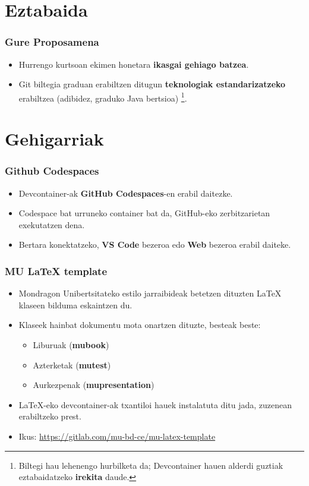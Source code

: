 \documentclass[lang=eu,biz=foe,aspectratio=169,handout]{mupresentation}
\begin{document}
\section{Eztabaida}

\begin{frame}
  \frametitle{Gure Proposamena}
  \begin{itemize}
    \item Hurrengo kurtsoan ekimen honetara \textbf{ikasgai gehiago batzea}.
    \item Git biltegia graduan erabiltzen ditugun \textbf{teknologiak estandarizatzeko} erabiltzea (adibidez, graduko Java bertsioa) \footnote{Biltegi hau lehenengo hurbilketa da; Devcontainer hauen alderdi guztiak eztabaidatzeko \textbf{irekita} daude.}.
  \end{itemize}

\end{frame}

\section[Three more things...]{Gehigarriak}

\begin{frame}
  \frametitle{Github Codespaces}
  \begin{itemize}
    \item Devcontainer-ak \textbf{GitHub Codespaces}-en erabil daitezke.
    \item Codespace bat urruneko container bat da, GitHub-eko zerbitzarietan exekutatzen dena.
    \item Bertara konektatzeko, \textbf{VS Code} bezeroa edo \textbf{Web} bezeroa erabil daiteke.
  \end{itemize}
\end{frame}

\begin{frame}
  \frametitle{MU LaTeX template}
  \begin{itemize}
    \item Mondragon Unibertsitateko estilo jarraibideak betetzen dituzten LaTeX klaseen bilduma eskaintzen du.
    \item Klaseek hainbat dokumentu mota onartzen dituzte, besteak beste:
      \begin{itemize}
        \item Liburuak (\textbf{mubook})
        \item Azterketak (\textbf{mutest})
        \item Aurkezpenak (\textbf{mupresentation})
      \end{itemize}
    \item LaTeX-eko devcontainer-ak txantiloi hauek instalatuta ditu jada, zuzenean erabiltzeko prest.
    \item Ikus: \url{https://gitlab.com/mu-bd-ce/mu-latex-template}
  \end{itemize}
\end{frame}
\end{document}

